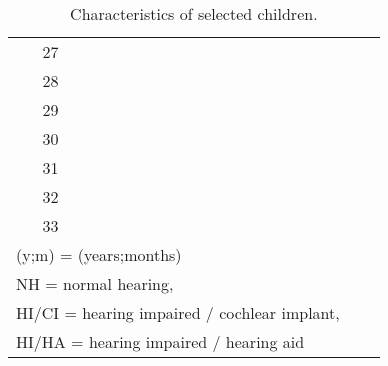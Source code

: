 \begin{table}[h!]
\begin{tabular}{| c | cccccccc |}
		27 &  &  &  &  &  &  &  &\\
		\rowcolor{gray}
		28 &  &  &  &  &  &  &  &\\
		29 &  &  &  &  &  &  &  &\\
		\rowcolor{gray}
		30 &  &  &  &  &  &  &  &\\
		31 &  &  &  &  &  &  &  &\\ 
		\rowcolor{gray}
		32 &  &  &  &  &  &  &  &\\ 
		33 &  &  &  &  &  &  &  &\\
		\hline
		\multicolumn{7}{l}{\footnotesize{(y;m) = (years;months)}} \\
		\multicolumn{7}{l}{\footnotesize{NH = normal hearing,}} \\
		\multicolumn{7}{l}{\footnotesize{HI/CI = hearing impaired / cochlear implant,}} \\
		\multicolumn{7}{l}{\footnotesize{HI/HA = hearing impaired / hearing aid}}
	\end{tabular}
	\caption{Characteristics of selected children.}
	\label{tab:children_char}
\end{table}


